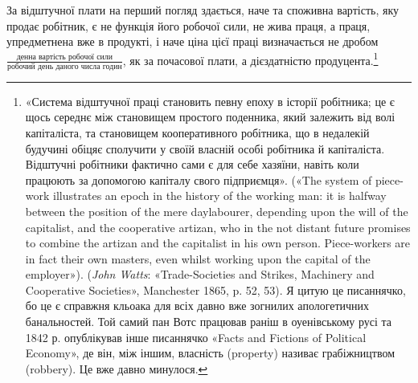 За відштучної плати на перший погляд здається, наче та
споживна вартість, яку продає робітник, є не функція його
робочої сили, не жива праця, а праця, упредметнена вже в
продукті, і наче ціна цієї праці визначається не дробом
$\frac{\text{денна вартість робочої сили}}{\text{робочий день даного числа годин}}$,
як за почасової плати, а дієздатністю продуцента.\footnote{
«Система відштучної праці становить певну епоху в історії робітника;
це є щось середнє між становищем простого поденника, який залежить
від волі капіталіста, та становищем кооперативного робітника, що
в недалекій будучині обіцяє сполучити у своїй власній особі робітника
й капіталіста. Відштучні робітники фактично сами є для себе хазяїни,
навіть коли працюють за допомогою капіталу свого підприємця». («The
system of piece-work illustrates an epoch in the history of the working
man: it is halfway between the position of the mere daylabourer, depending
upon the will of the capitalist, and the cooperative artizan, who in
the not distant future promises to combine the artizan and the capitalist
in his own person. Piece-workers are in fact their own masters, even whilst
working upon the capital of the employer»). (\emph{John Watts}: «Trade-Societies
and Strikes, Machinery and Cooperative Societies», Manchester 1865,
p. 52, 53). Я цитую це писаннячко, бо це є справжня кльоака для всіх
давно вже зогнилих апологетичних банальностей. Той самий пан Вотс
працював раніш в оуенівському русі та 1842 р. опублікував інше писаннячко
«Facts and Fictions of Political Economy», де він, між іншим, власність
(property) називає грабіжництвом (robbery). Це вже давно минулося.
}

